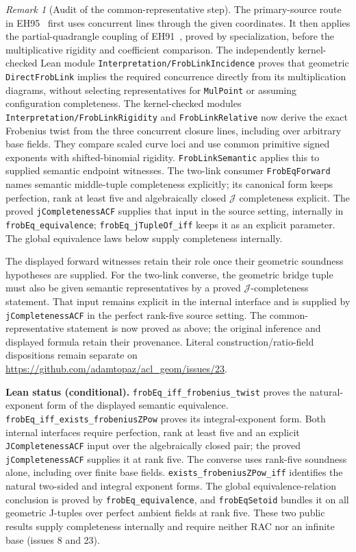 \documentclass[11pt,oneside]{article}
\theoremstyle{definition}
\theoremstyle{remark}
\newtheorem{remark}[theorem]{Remark}
\newcommand{\Jrel}{\mathcal{J}}
\newcommand{\lean}[1]{\nolinkurl{#1}}
\begin{document}
\begin{remark}[Audit of the common-representative step]
The primary-source route in EH95~\cite[Lemma 2.8, Figure 3]{EH1995} first uses
concurrent lines through the given coordinates. It then applies the
partial-quadrangle coupling of EH91~\cite[Lemma 2.1.1, pp. 6--7]{EH1991}, proved by
specialization, before the multiplicative rigidity and coefficient comparison.
The independently kernel-checked Lean module
\lean{Interpretation/FrobLinkIncidence} proves that geometric
\lean{DirectFrobLink} implies the required concurrence directly from its
multiplication diagrams, without selecting representatives for \lean{MulPoint} or
assuming configuration completeness. The kernel-checked modules
\lean{Interpretation/FrobLinkRigidity} and \lean{FrobLinkRelative} now derive the exact
Frobenius twist from the three concurrent closure lines, including over arbitrary base fields.
They compare scaled curve loci and use common primitive signed exponents with shifted-binomial
rigidity. \lean{FrobLinkSemantic} applies this to supplied semantic endpoint witnesses.
The two-link consumer \lean{FrobEqForward} names semantic middle-tuple completeness explicitly;
its canonical form keeps perfection, rank at least five and algebraically closed
$\Jrel$ completeness explicit. The proved \lean{jCompletenessACF} supplies that input in
the source setting, internally in \lean{frobEq_equivalence}; \lean{frobEq_jTupleOf_iff}
keeps it as an explicit parameter.
The global equivalence laws below supply completeness internally.

The displayed forward witnesses retain their role once their geometric soundness
hypotheses are supplied. For the two-link converse, the geometric bridge tuple must
also be given semantic representatives by a proved $\Jrel$-completeness statement.
That input remains explicit in the internal interface and is supplied by
\lean{jCompletenessACF} in the perfect rank-five source setting. The common-representative
statement is now proved as above; the original inference and displayed formula retain
their provenance. Literal construction/ratio-field dispositions remain separate on
\url{https://github.com/adamtopaz/acl_geom/issues/23}.
\end{remark}

\noindent\textbf{Lean status (conditional).}
\lean{frobEq_iff_frobenius_twist} proves the natural-exponent form of the displayed
semantic equivalence. \lean{frobEq_iff_exists_frobeniusZPow} proves its integral-exponent
form. Both internal interfaces require perfection, rank at least five and an explicit
\lean{JCompletenessACF} input over the algebraically closed pair; the proved
\lean{jCompletenessACF} supplies it at rank five. The converse uses rank-five soundness
alone, including over finite base fields. \lean{exists_frobeniusZPow_iff} identifies the
natural two-sided and integral exponent forms. The global equivalence-relation conclusion
is proved by \lean{frobEq_equivalence}, and \lean{frobEqSetoid} bundles it on all geometric
J-tuples over perfect ambient fields at rank five. These two public results supply
completeness internally and require neither RAC nor an infinite base (issues 8 and 23).
\end{document}

